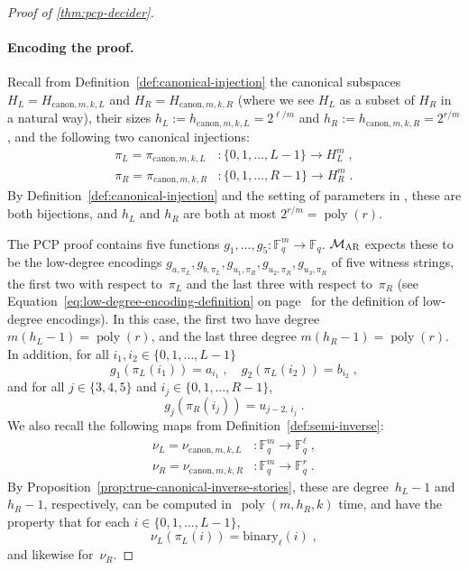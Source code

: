 \documentclass[11pt]{article}
\theoremstyle{definition}
\newcommand{\F}{\ensuremath{\mathbb{F}}}
\DeclareMathOperator{\poly}{poly}
\newcommand{\gamestyle}[1]{\ensuremath{\textsc{#1}}\xspace}
\newcommand{\ar}{\gamestyle{AR}}
\newcommand{\bin}{\mathrm{binary}}
\newcommand{\pcpverifier}{\mathcal{M}_\ar}
\newcommand{\canH}[3]{H_{\mathrm{canon}, #1, #2, #3}}
\newcommand{\canlilh}[3]{h_{\mathrm{canon}, #1, #2, #3}}
\newcommand{\canin}[3]{\pi_{\mathrm{canon},#1,#2,#3}}
\begin{document}
\begin{proof}[Proof of \cref{thm:pcp-decider}]
  \paragraph{Encoding the proof.}
  Recall from Definition~\ref{def:canonical-injection} the canonical subspaces
  $H_L= \canH{m}{k}{L}$ and $H_R = \canH{m}{k}{R}$ (where we see $H_L$ as a
  subset of $H_R$ in a natural way), their sizes $h_L:= \canlilh{m}{k}{L} =
  2^{\ell/m}$ and $h_R := \canlilh{m}{k}{R} = 2^{r/m}$, and the following two
  canonical injections:
  \begin{align*}
    \pi_L=\canin{m}{k}{L} & :\{ 0, 1, \ldots, L-1 \} \rightarrow H_L^m\;,\\
    \pi_R=\canin{m}{k}{R} & :\{ 0, 1, \ldots, R-1 \} \rightarrow H_R^m\;.
  \end{align*}
  By Definition~\ref{def:canonical-injection}
  and the setting of parameters in , these are both bijections,
  and $h_L$ and $h_R$ are both at most $2^{r/m} = \poly(r)$.

  The PCP proof contains five functions $g_1, \ldots, g_5: \F_q^m \rightarrow
  \F_q$.
  $\pcpverifier$ expects these to be the low-degree encodings $g_{a, \pi_L},
  g_{b, \pi_L}, g_{u_1, \pi_R}, g_{u_2, \pi_R}, g_{u_3, \pi_R}$ of five witness
  strings, the first two with respect to~$\pi_L$ and the last three with respect
  to~$\pi_R$ (see Equation~\eqref{eq:low-degree-encoding-definition} on
  page~\pageref{eq:low-degree-encoding-definition} for the definition of
  low-degree encodings).
  In this case, the first two have degree $m(h_L-1)=\poly(r)$, and the last
  three degree $m(h_R-1) = \poly(r)$.
  In addition, for all $i_1, i_2 \in \{0, 1, \ldots, L-1\}$
  \begin{equation*}
    g_1(\pi_L(i_1)) = a_{i_1}\;, \quad
    g_2(\pi_L(i_2)) = b_{i_2}\;,
  \end{equation*}
  and for all $j\in \{3, 4, 5\}$ and $i_j \in \{0, 1, \ldots, R-1\}$\;,
  \begin{equation}
    \label{eq:im-an-encoding}
    g_j(\pi_R(i_j)) = u_{j-2,\, i_j}\;.
  \end{equation}
  We also recall the following maps from Definition~\ref{def:semi-inverse}:
  \begin{align*}
    \nu_L=\nu_{\mathrm{canon},m,k,L} &:\F_q^m \rightarrow \F_q^\ell\;,\\
    \nu_R=\nu_{\mathrm{canon},m,k,R} &:\F_q^m \rightarrow \F_q^r\;.
  \end{align*}
  By Proposition~\ref{prop:true-canonical-inverse-stories}, these are
  degree~$h_L-1$ and $h_R-1$, respectively, can be computed in~$\poly(m, h_R,
  k)$ time, and have the property that for each $i \in \{0, 1, \ldots, L-1\}$,
  \begin{equation}
    \label{eq:is-an-inverse}
    \nu_L(\pi_L(i)) = \bin_\ell(i)\;,
  \end{equation}
  and likewise for~$\nu_R$.


\end{proof}
\end{document}
